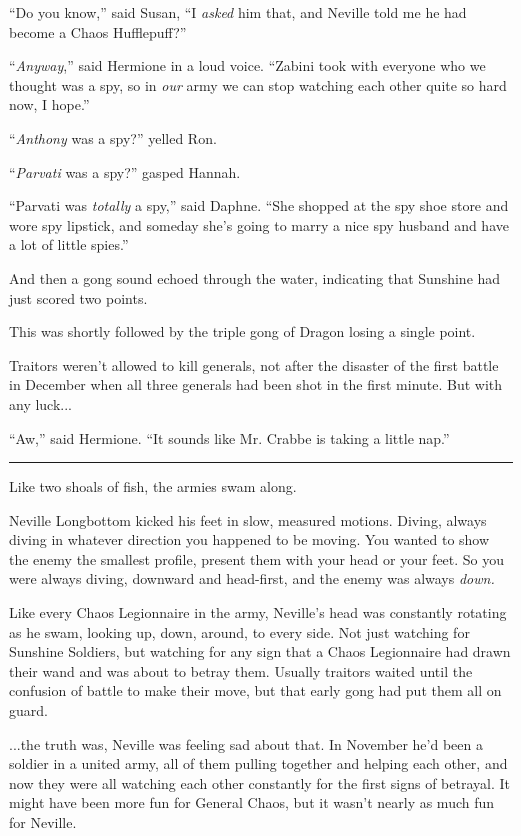 ``Do you know,'' said Susan, ``I \emph{asked} him that, and Neville told me he had become a Chaos Hufflepuff?''

``\emph{Anyway},'' said Hermione in a loud voice. ``Zabini took with everyone who we thought was a spy, so in \emph{our} army we can stop watching each other quite so hard now, I hope.''

``\emph{Anthony} was a spy?'' yelled Ron.

``\emph{Parvati} was a spy?'' gasped Hannah.

``Parvati was \emph{totally} a spy,'' said Daphne. ``She shopped at the spy shoe store and wore spy lipstick, and someday she's going to marry a nice spy husband and have a lot of little spies.''

And then a gong sound echoed through the water, indicating that Sunshine had just scored two points.

This was shortly followed by the triple gong of Dragon losing a single point.

Traitors weren't allowed to kill generals, not after the disaster of the first battle in December when all three generals had been shot in the first minute. But with any luck...

``Aw,'' said Hermione. ``It sounds like Mr. Crabbe is taking a little nap.''

\begin{center}\rule{3in}{0.4pt}\end{center}

Like two shoals of fish, the armies swam along.

Neville Longbottom kicked his feet in slow, measured motions. Diving, always diving in whatever direction you happened to be moving. You wanted to show the enemy the smallest profile, present them with your head or your feet. So you were always diving, downward and head-first, and the enemy was always \emph{down.}

Like every Chaos Legionnaire in the army, Neville's head was constantly rotating as he swam, looking up, down, around, to every side. Not just watching for Sunshine Soldiers, but watching for any sign that a Chaos Legionnaire had drawn their wand and was about to betray them. Usually traitors waited until the confusion of battle to make their move, but that early gong had put them all on guard.

...the truth was, Neville was feeling sad about that. In November he'd been a soldier in a united army, all of them pulling together and helping each other, and now they were all watching each other constantly for the first signs of betrayal. It might have been more fun for General Chaos, but it wasn't nearly as much fun for Neville.

